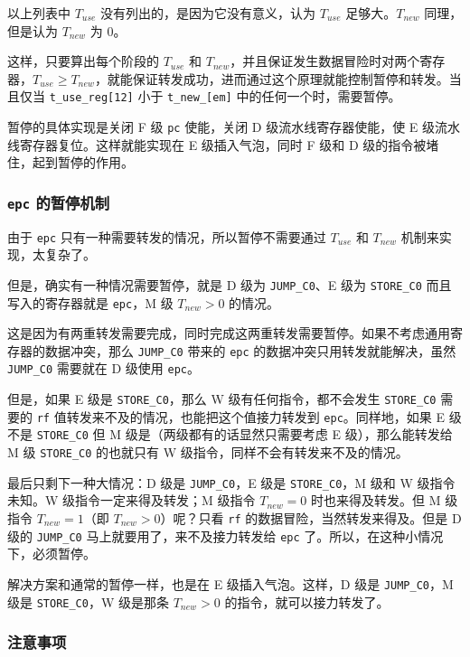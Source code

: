 \documentclass[12pt,AutoFakeBold,AutoFakeSlant]{article}
\newcommand{\ms}[1]{\texttt{#1}}
\begin{document}
以上列表中 $ T_{use} $ 没有列出的，是因为它没有意义，认为 $ T_{use} $ 足够大。$ T_{new} $ 同理，但是认为 $ T_{new} $ 为 0。

这样，只要算出每个阶段的 $ T_{use} $ 和 $ T_{new} $，并且保证发生数据冒险时对两个寄存器，$ T_{use} \ge T_{new} $，就能保证转发成功，进而通过这个原理就能控制暂停和转发。当且仅当 \texttt{t\_use\_reg{[}12{]}} 小于 \texttt{t\_new\_{[}em{]}} 中的任何一个时，需要暂停。

暂停的具体实现是关闭 F 级 \ms{pc} 使能，关闭 D 级流水线寄存器使能，使 E 级流水线寄存器复位。这样就能实现在 E 级插入气泡，同时 F 级和 D 级的指令被堵住，起到暂停的作用。

\subsubsection{\ms{epc} 的暂停机制}

由于 \texttt{epc} 只有一种需要转发的情况，所以暂停不需要通过 $ T_{use} $ 和 $ T_{new} $ 机制来实现，太复杂了。

但是，确实有一种情况需要暂停，就是 D 级为
\texttt{JUMP\_C0}、E 级为 \texttt{STORE\_C0} 而且写入的寄存器就是
\texttt{epc}，M 级 $ T_{new} > 0 $ 的情况。

这是因为有两重转发需要完成，同时完成这两重转发需要暂停。如果不考虑通用寄存器的数据冲突，那么 \ms{JUMP\_C0} 带来的 \ms{epc} 的数据冲突只用转发就能解决，虽然 \ms{JUMP\_C0} 需要就在 D 级使用 \ms{epc}。

但是，如果 E 级是 \ms{STORE\_C0}，那么 W 级有任何指令，都不会发生 \ms{STORE\_C0} 需要的 \ms{rf} 值转发来不及的情况，也能把这个值接力转发到 \ms{epc}。同样地，如果 E 级不是 \ms{STORE\_C0} 但 M 级是（两级都有的话显然只需要考虑 E 级），那么能转发给 M 级 \ms{STORE\_C0} 的也就只有 W 级指令，同样不会有转发来不及的情况。

最后只剩下一种大情况：D 级是 \ms{JUMP\_C0}，E 级是 \ms{STORE\_C0}，M 级和 W 级指令未知。W 级指令一定来得及转发；M 级指令 $ T_{new} = 0 $ 时也来得及转发。但 M 级指令 $ T_{new} = 1 $（即 $ T_{new} > 0 $）呢？只看 \ms{rf} 的数据冒险，当然转发来得及。但是 D 级的 \ms{JUMP\_C0} 马上就要用了，来不及接力转发给 \ms{epc} 了。所以，在这种小情况下，必须暂停。

解决方案和通常的暂停一样，也是在 E 级插入气泡。这样，D 级是 \ms{JUMP\_C0}，M 级是 \ms{STORE\_C0}，W 级是那条 $ T_{new} > 0 $ 的指令，就可以接力转发了。

\subsubsection{注意事项}
\end{document}
